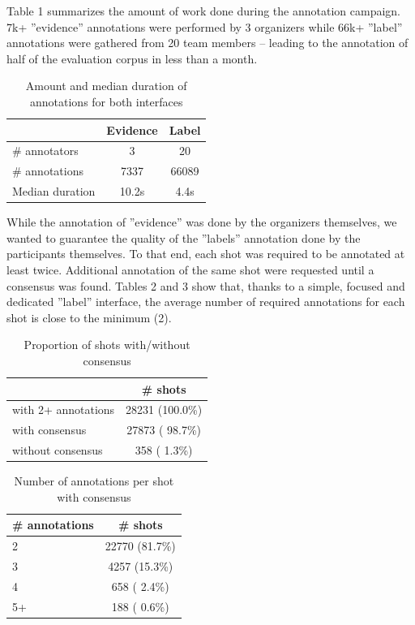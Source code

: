 \documentclass[10pt, a4paper]{article}
\begin{document}
Table 1 summarizes the amount of work done during the annotation campaign.
7k+ ''evidence'' annotations were performed by 3 organizers while 66k+ ''label''
annotations were gathered from 20 team members -- leading to the annotation of
half of the evaluation corpus in less than a month.


\begin{table}[ht]
  \centering
  \begin{tabular}{|l|c|c|}
    \hline
                           & Evidence  & Label      \\
    \hline
    \hline
    \# annotators           & 3         & 20         \\
    \# annotations          & 7337      & 66089      \\
    Median duration        & 10.2s     & 4.4s       \\
    \hline
  \end{tabular}
  \caption{Amount and median duration of annotations for both interfaces}
  \label{tab:annotations}
\end{table}

While the annotation of ''evidence'' was done by the organizers themselves,
we wanted to guarantee the quality of the ''labels'' annotation done by the
participants themselves. To that end, each shot was required to be annotated at
least twice. Additional annotation of the same shot were requested until a
consensus was found. Tables 2 and 3 show that, thanks to a simple, focused and
dedicated ''label'' interface, the average number of required annotations
for each shot is close to the minimum (2).

\begin{table}[ht]
  \centering
  \begin{tabular}{|l|c|}
    \hline
                   		&  \# shots 			\\
    \hline
    \hline
	with 2+ annotations 	& 28231 (100.0\%) 	\\
	with consensus     	& 27873 ( 98.7\%) 	\\
	without consensus 	&   358 (  1.3\%) 	\\
    \hline
  \end{tabular}
  \caption{Proportion of shots with/without consensus}
  \label{tab:consensus1}
\end{table}


\begin{table}[ht]
  \centering
  \begin{tabular}{|l|c|}
    \hline
    \# annotations 		&  \# shots 			\\
    \hline
    \hline
	2             		& 22770 (81.7\%) \\
	3             		&  4257 (15.3\%) \\
	4             		&   658 ( 2.4\%) \\
	5+            		&   188 ( 0.6\%) \\
    \hline
  \end{tabular}
  \caption{Number of annotations per shot with consensus}
  \label{tab:consensus2}
\end{table}
\end{document}
